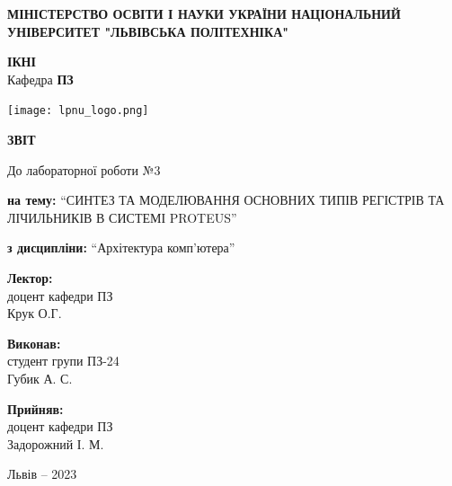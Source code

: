 \documentclass[12pt]{extarticle}
\begin{document}
\begin{titlepage}
    \begin{center}
        \textbf{\normalsize{\MakeUppercase{
            Міністерство Освіти і науки України
            Національний університет "Львівська політехніка"
        }}}

        \begin{flushright}
        \textbf{ІКНІ}\\
        Кафедра \textbf{ПЗ}
        \end{flushright}
        \vspace{15mm}

        \texttt{[image: lpnu\_logo.png]}

        \vspace*{\fill}

        \textbf{\normalsize{\MakeUppercase{Звіт}}}
            
        До лабораторної роботи №3

        \textbf{на тему:} “СИНТЕЗ ТА МОДЕЛЮВАННЯ ОСНОВНИХ ТИПІВ РЕГІСТРІВ ТА
        ЛІЧИЛЬНИКІВ В СИСТЕМІ PROTEUS”

        \textbf{з дисципліни:} “Архітектура комп’ютера”
            
        \vspace*{\fill}

        \begin{flushright}

            \textbf{Лектор:}\\
            доцент кафедри ПЗ\\
            Крук О.Г.\\
            \vspace{12pt}

            \textbf{Виконав:}\\
            студент групи ПЗ-24\\
            Губик А. С.\\
            \vspace{12pt}

            \textbf{Прийняв:}\\
            доцент кафедри ПЗ\\
            Задорожний І. М.\\
        \vspace{12pt}
        \end{flushright}

        Львів -- 2023
            
            
    \end{center}
\end{titlepage}
\end{document}
